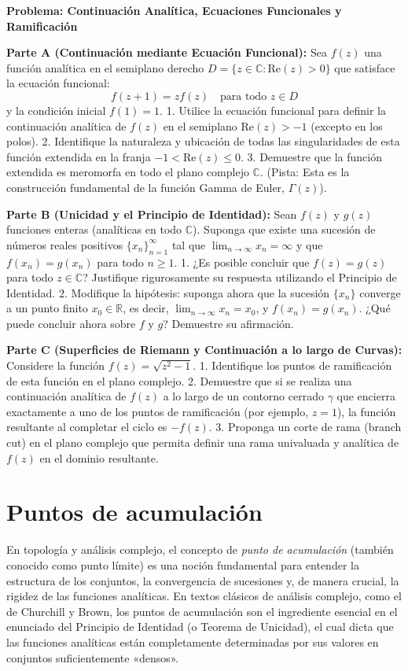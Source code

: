 \documentclass[a4paper]{article}
\begin{document}
\textbf{Problema: Continuación Analítica, Ecuaciones Funcionales y Ramificación}

\textbf{Parte A (Continuación mediante Ecuación Funcional):}
Sea $f(z)$ una función analítica en el semiplano derecho $D = \{z \in \mathbb{C} : \text{Re}(z) > 0\}$ que satisface la ecuación funcional:
$$ f(z+1) = z f(z) \quad \text{para todo } z \in D $$
y la condición inicial $f(1) = 1$.
1. Utilice la ecuación funcional para definir la continuación analítica de $f(z)$ en el semiplano $\text{Re}(z) > -1$ (excepto en los polos).
2. Identifique la naturaleza y ubicación de todas las singularidades de esta función extendida en la franja $-1 < \text{Re}(z) \leq 0$.
3. Demuestre que la función extendida es meromorfa en todo el plano complejo $\mathbb{C}$. (Pista: Esta es la construcción fundamental de la función Gamma de Euler, $\Gamma(z)$).

\textbf{Parte B (Unicidad y el Principio de Identidad):}
Sean $f(z)$ y $g(z)$ funciones enteras (analíticas en todo $\mathbb{C}$). Suponga que existe una sucesión de números reales positivos $\{x_n\}_{n=1}^{\infty}$ tal que $\lim_{n \to \infty} x_n = \infty$ y que $f(x_n) = g(x_n)$ para todo $n \geq 1$.
1. ¿Es posible concluir que $f(z) = g(z)$ para todo $z \in \mathbb{C}$? Justifique rigurosamente su respuesta utilizando el Principio de Identidad.
2. Modifique la hipótesis: suponga ahora que la sucesión $\{x_n\}$ converge a un punto finito $x_0 \in \mathbb{R}$, es decir, $\lim_{n \to \infty} x_n = x_0$, y $f(x_n) = g(x_n)$. ¿Qué puede concluir ahora sobre $f$ y $g$? Demuestre su afirmación.

\textbf{Parte C (Superficies de Riemann y Continuación a lo largo de Curvas):}
Considere la función $f(z) = \sqrt{z^2 - 1}$.
1. Identifique los puntos de ramificación de esta función en el plano complejo.
2. Demuestre que si se realiza una continuación analítica de $f(z)$ a lo largo de un contorno cerrado $\gamma$ que encierra exactamente a uno de los puntos de ramificación (por ejemplo, $z=1$), la función resultante al completar el ciclo es $-f(z)$.
3. Proponga un corte de rama (branch cut) en el plano complejo que permita definir una rama univaluada y analítica de $f(z)$ en el dominio resultante.


\section{Puntos de acumulación}

En topología y análisis complejo, el concepto de \textit{punto de acumulación} (también conocido como punto límite) es una noción fundamental para entender la estructura de los conjuntos, la convergencia de sucesiones y, de manera crucial, la rigidez de las funciones analíticas. En textos clásicos de análisis complejo, como el de Churchill y Brown, los puntos de acumulación son el ingrediente esencial en el enunciado del Principio de Identidad (o Teorema de Unicidad), el cual dicta que las funciones analíticas están completamente determinadas por sus valores en conjuntos suficientemente «densos».
\end{document}
